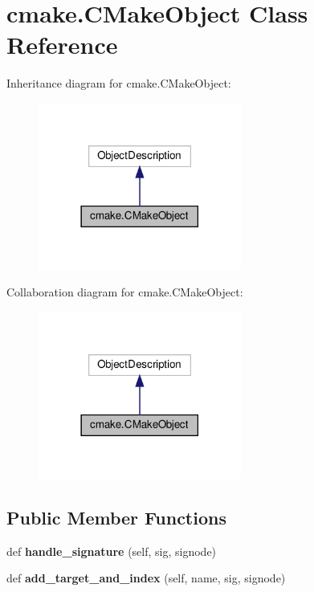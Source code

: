 \hypertarget{classcmake_1_1CMakeObject}{}\section{cmake.\+C\+Make\+Object Class Reference}
\label{classcmake_1_1CMakeObject}


Inheritance diagram for cmake.\+C\+Make\+Object\+:
\nopagebreak
\begin{figure}[H]
\begin{center}
\leavevmode
\includegraphics[width=189pt]{classcmake_1_1CMakeObject__inherit__graph}
\end{center}
\end{figure}


Collaboration diagram for cmake.\+C\+Make\+Object\+:
\nopagebreak
\begin{figure}[H]
\begin{center}
\leavevmode
\includegraphics[width=189pt]{classcmake_1_1CMakeObject__coll__graph}
\end{center}
\end{figure}
\subsection*{Public Member Functions}
\begin{DoxyCompactItemize}
\item 
\mbox{\label{classcmake_1_1CMakeObject_a315ae4a1d65f1d45f0e77e146b31e80e}} 
def {\bfseries handle\+\_\+signature} (self, sig, signode)
\item 
\mbox{\label{classcmake_1_1CMakeObject_a482e03d79771bd8937a47022b493f8bf}} 
def {\bfseries add\+\_\+target\+\_\+and\+\_\+index} (self, name, sig, signode)
\end{DoxyCompactItemize}
